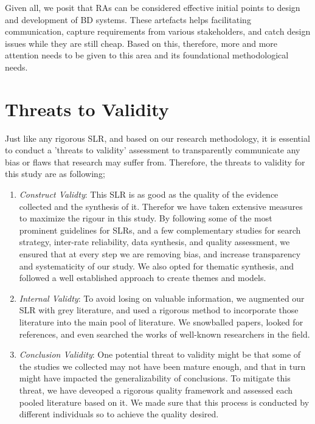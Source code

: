 \documentclass[review]{elsarticle}
\begin{document}
Given all, we posit that RAs can be considered effective initial points to design and development of BD systems. These artefacts helps facilitating communication, capture requirements from various stakeholders, and catch design issues while they are still cheap. Based on this, therefore, more and more attention needs to be given to this area and its foundational methodological needs. 

\section{Threats to Validity}

Just like any rigorous SLR, and based on our research methodology, it is essential to conduct a 'threats to validity' assessment to transparently communicate any bias or flaws that research may suffer from. Therefore, the threats to validity for this study are as following;

\begin{enumerate}
    \item \emph{Construct Validty}: This SLR is as good as the quality of the evidence collected and the synthesis of it. Therefor we have taken extensive measures to maximize the rigour in this study. By following some of the most prominent guidelines for SLRs, and a few complementary studies for search strategy, inter-rate reliability, data synthesis, and quality assessment, we ensured that at every step we are removing bias, and increase transparency and systematicity of our study. We also opted for thematic synthesis, and followed a well established approach to create themes and models.
    \item \emph{Internal Validty}: To avoid losing on valuable information, we augmented our SLR with grey literature, and used a rigorous method to incorporate those literature into the main pool of literature. We snowballed papers, looked for references, and even searched the works of well-known researchers in the field. 
    \item \emph{Conclusion Validity}: One potential threat to validity might be that some of the studies we collected may not have been mature enough, and that in turn might have impacted the generalizability of conclusions. To mitigate this threat, we have deveoped a rigorous quality framework and assessed each pooled literature based on it. We made sure that this process is conducted by different individuals so to achieve the quality desired. 
\end{enumerate}
\end{document}
